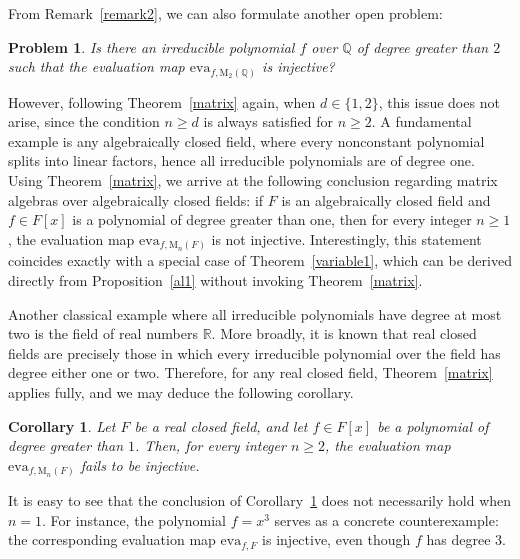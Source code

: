 \documentclass{amsart}
\newtheorem{open}[theorem]{Problem}
\newtheorem{corollary}[theorem]{Corollary}
\theoremstyle{definition}
\begin{document}
	From Remark~\ref{remark2}, we can also formulate another open problem:
	
	\begin{open}
		Is there an irreducible polynomial $f$ over $\mathbb{Q}$ of degree greater than $2$ such that the evaluation map $\mathrm{eva}_{f,\mathrm{M}_2(\mathbb{Q})}$ is injective?
	\end{open}
	
	
	
	However, following Theorem~\ref{matrix} again,  when \( d \in \{1,2\} \), this issue does not arise, since the condition \( n \geq d \) is always satisfied for \( n \geq 2 \). A fundamental example is any algebraically closed field, where every nonconstant polynomial splits into linear factors, hence all irreducible polynomials are of degree one. Using Theorem~\ref{matrix}, we arrive at the following conclusion regarding matrix algebras over algebraically closed fields: if \( F \) is an algebraically closed field and \( f \in F[x] \) is a polynomial of degree greater than one, then for every integer \( n \geq 1 \), the evaluation map \( \mathrm{eva}_{f,\mathrm{M}_n(F)} \) is not injective. Interestingly, this statement coincides exactly with a special case of Theorem~\ref{variable1}, which can be derived directly from Proposition~\ref{al1} without invoking Theorem~\ref{matrix}.
	
	
	
	Another classical example where all irreducible polynomials have degree at most two is the field of real numbers \( \mathbb{R} \). More broadly, it is known that real closed fields are precisely those in which every irreducible polynomial over the field has degree either one or two. Therefore, for any real closed field, Theorem~\ref{matrix} applies fully, and we may deduce the following corollary.
	
	\begin{corollary}\label{real closed}
		Let \( F \) be a real closed field, and let \( f \in F[x] \) be a polynomial of degree greater than $1$. Then, for every integer \( n \geq 2 \), the evaluation map \( \mathrm{eva}_{f,\mathrm{M}_n(F)} \) fails to be injective.
	\end{corollary}
	
	It is easy to see that the conclusion of Corollary~\ref{real closed} does not necessarily hold when \( n = 1 \). For instance, the polynomial \( f = x^3 \) serves as a concrete counterexample: the corresponding evaluation map \( \mathrm{eva}_{f,F} \) is injective, even though \( f \) has degree 3.
	
\end{document}
